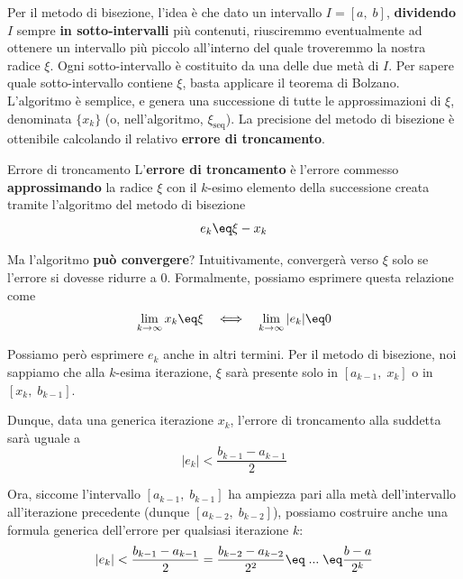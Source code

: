 \nwl
Per il metodo di bisezione, l'idea è che dato un intervallo $I = [a, \; b]$, \textbf{dividendo} $I$ sempre \textbf{in sotto-intervalli} più contenuti, riusciremmo eventualmente ad ottenere un intervallo più piccolo all'interno del quale troveremmo la nostra radice $\xi$. Ogni sotto-intervallo è costituito da una delle due metà di $I$. Per sapere quale sotto-intervallo contiene $\xi$, basta applicare il teorema di Bolzano. L'algoritmo è semplice, e genera una successione di tutte le approssimazioni di $\xi$, denominata $\{x_k\}$ (o, nell'algoritmo, $\xi_{\text{seq}}$). La precisione del metodo di bisezione è ottenibile calcolando il relativo \textbf{errore di troncamento}.

\begin{definition}{Errore di troncamento}
    L'\textbf{errore di troncamento} è l'errore commesso \textbf{approssimando} la radice $\xi$ con il $k$-esimo elemento della successione creata tramite l'algoritmo del metodo di bisezione
    \[ e_k \eq \xi - x_k \]
\end{definition}

Ma l'algoritmo \textbf{può convergere}? Intuitivamente, convergerà verso $\xi$ solo se l'errore si dovesse ridurre a 0. Formalmente, possiamo esprimere questa relazione come
\[ \lim_{k \to \infty} x_k \eq \xi \quad \Longleftrightarrow \quad \lim_{k \to \infty} |e_k| \eq 0 \]

Possiamo però esprimere $e_k$ anche in altri termini. Per il metodo di bisezione, noi sappiamo che alla $k$-esima iterazione, $\xi$ sarà presente solo in $[a_{k - 1}, \; x_k]$ o in $[x_k, \; b_{k - 1}]$.

\begin{center}
\end{center}

Dunque, data una generica iterazione $x_k$, l'errore di troncamento alla suddetta sarà uguale a
\[ |e_k| < \frac{b_{k - 1} - a_{k - 1}}{2} \]

Ora, siccome l'intervallo $[a_{k - 1}, \; b_{k - 1}]$ ha ampiezza pari alla metà dell'intervallo all'iterazione precedente (dunque $[a_{k - 2}, \; b_{k - 2}]$), possiamo costruire anche una formula generica dell'errore per qualsiasi iterazione $k$:
\[ |e_k| < \frac{b_{k - 1} - a_{k - 1}}{2} = \frac{b_{k - 2} - a_{k - 2}}{2^2} \eq \; ... \; \eq \frac{b - a}{2^k} \]

